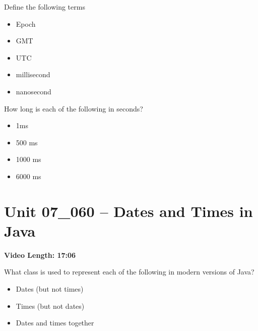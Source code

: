 \documentclass[letterpaper,12pt]{exam}
\newcommand{\unit}{Unit 07}
\begin{document}
\begin{questions}
\begin{samepage}
    \question Define the following terms
      \begin{itemize} 
        \item Epoch
        \vspace{5mm}
        \item GMT
        \vspace{5mm} 
        \item UTC
        \vspace{5mm} 
        \item millisecond 
        \vspace{5mm} 
        \item nanosecond
       \end{itemize}
\end{samepage}

\begin{samepage}
    \question How long is each of the following in seconds?
      \begin{itemize}
        \item 1ms
        \vspace{5mm}
        \item 500 ms
        \vspace{5mm}
        \item 1000 ms
        \vspace{5mm}
        \item 6000 ms
        \vspace{5mm}
       \end{itemize}
\end{samepage}


\section*{\unit\_060 -- Dates and Times in Java} %
\noindent \textbf{Video Length: 17:06}

\begin{samepage}
    \question What class is used to represent each of the following in modern versions of Java?
      \begin{itemize}  
        \item Dates (but not times)
        \vspace{5mm}
        \item Times (but not dates)       
        \vspace{5mm}
        \item Dates and times together
       \end{itemize}
\end{samepage}


\end{questions}
\end{document}
